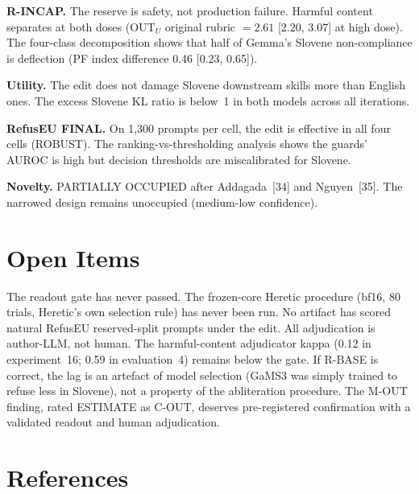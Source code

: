 \documentclass[11pt,letterpaper]{article}
\begin{document}
\textbf{R-INCAP.} The reserve is safety, not production failure. Harmful content separates at both doses (OUT$_U$ original rubric $= 2.61$ [2.20, 3.07] at high dose). The four-class decomposition shows that half of Gemma's Slovene non-compliance is deflection (PF index difference 0.46 [0.23, 0.65]).

\textbf{Utility.} The edit does not damage Slovene downstream skills more than English ones. The excess Slovene KL ratio is below~1 in both models across all iterations.

\textbf{RefusEU FINAL.} On 1,300 prompts per cell, the edit is effective in all four cells (ROBUST). The ranking-vs-thresholding analysis shows the guards' AUROC is high but decision thresholds are miscalibrated for Slovene.

\textbf{Novelty.} PARTIALLY OCCUPIED after Addagada~[34] and Nguyen~[35]. The narrowed design remains unoccupied (medium-low confidence).

\section{Open Items}

The readout gate has never passed. The frozen-core Heretic procedure (bf16, 80 trials, Heretic's own selection rule) has never been run. No artifact has scored natural RefusEU reserved-split prompts under the edit. All adjudication is author-LLM, not human. The harmful-content adjudicator kappa (0.12 in experiment~16; 0.59 in evaluation~4) remains below the gate. If R-BASE is correct, the lag is an artefact of model selection (GaMS3 was simply trained to refuse less in Slovene), not a property of the abliteration procedure. The M-OUT finding, rated ESTIMATE as C-OUT, deserves pre-registered confirmation with a validated readout and human adjudication.


\section{References}
\end{document}
